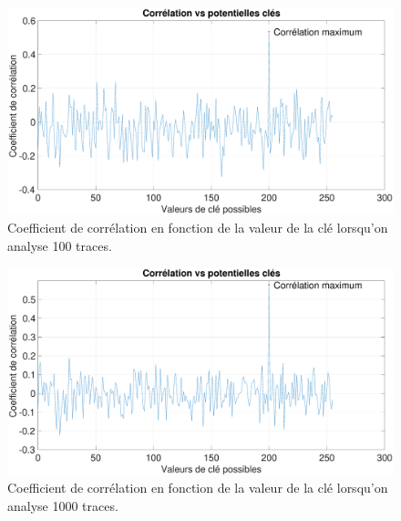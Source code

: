 \documentclass[10pt, oneside, a4paper]{article}
\begin{document}
\begin{figure}[htbp]
    \centering
    \hspace{-1.2 cm}
    \includegraphics[scale=0.25]{image/100.eps}    \caption{Coefficient de corrélation en fonction de la valeur de la clé lorsqu'on analyse 100 traces.}    \label{fig:100}
\end{figure}

\begin{figure}[htbp]
    \centering
    \hspace{-1.2 cm}   
    \includegraphics[scale=0.25]{image/1000.eps}    \caption{Coefficient de corrélation en fonction de la valeur de la clé lorsqu'on analyse 1000 traces.}    \label{fig:1000}
\end{figure}

\newpage
\end{document}
